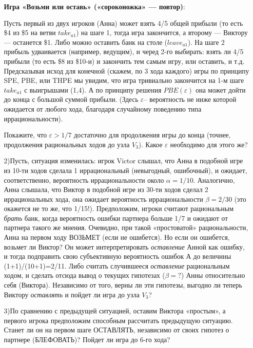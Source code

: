 \begin{problem}
 {\bf Игра «Возьми или оставь» («сороконожка» — повтор)}:
%

Пусть первый из двух игроков (Анна) может взять 4/5 общей
прибыли (то есть \$4 из \$5 на ветви $take_{a1}$) на шаге
1, тогда игра закончится, а второму — Виктору — останется
\$1. Либо можно оставить банк на столе ($leave_{a1}$). На
шаге 2 прибыль удваивается (например, ведущим), и черед
2-го выбирать: взять ли 4/5 прибыли (то есть \$8 из \$10-и)
и закончить тем самым игру, или оставить, и т.д.
Предсказывая исход для конечной (скажем, по 3 хода каждого)
игры по принципу SPE, PBE, или THPE мы увидим, что игра
тривиально закончится на 1-м шаге $take_{a1}$ с выигрышами
(1,4). А по принципу решения $PBE(\varepsilon)$ она может
дойти до конца с большой суммой прибыли. (Здесь
$\varepsilon$-- вероятность не ниже которой ожидается от
любого хода, благодаря случайному поведению типа
иррациональности).

Покажите, что $\varepsilon >1/7$ достаточно для продолжения
игры до конца (точнее, продолжения рациональных ходов до
узла $V_3$). Какое $\varepsilon$ необходимо для этого же?

2)Пусть, ситуация изменилась: игрок Victor слышал, что Анна
в подобной игре из 10-ти ходов сделала 1 иррациональный
(невыгодный, ошибочный), и ожидает, соответственно,
вероятность иррациональности около $\alpha= 1/10$.
Аналогично,  Анна слышала, что Виктор в подобной игре из
30-ти ходов сделал 2 иррациональных хода, она ожидает
вероятность иррациональности $\beta= 2/30$ (это окажется не
то же, что 1/15!). Предположим, игроки считают рациональным
{\em брать} банк, когда вероятность ошибки партнера больше
1/7 и ожидают от партнера такого же мнения. Очевидно, при
такой «простоватой» рациональности, Анна на первом ходу
ВОЗЬМЕТ (если не ошибется). Но если он ошибется, возьмет ли
Виктор? Он может интерпретировать {\em оставление} Анной
как ошибку, и тогда подправить свою субъективную
вероятность ошибок А до величины (1+1)/(10+1)=2/11. Либо
считать случившееся {\em оставление} рациональным ходом, и
сделать отсюда вывод о текущих гипотезах ($\beta=?$) Анны
относительно себя (Виктора). Независимо от того, верны ли
эти гипотезы, выгодно ли теперь Виктору {\em оставлять} и
пойдет ли игра до узла $V_3$?

3)По сравнению с предыдущей ситуацией, оставим Виктора
«простым», а первого игрока предположим способным
рассчитать предыдущую ситуацию. Станет ли он на первом шаге
ОСТАВЛЯТЬ, независимо от своих гипотез о партнере
(БЛЕФОВАТЬ)? Пойдет ли игра до 6-го хода?


\end{problem}
